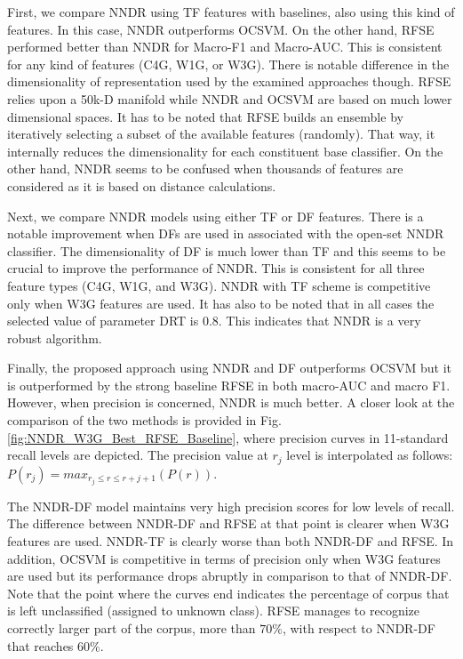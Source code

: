 First, we compare NNDR using TF features with baselines, also using this kind of features. In this case, NNDR outperforms OCSVM. On the other hand, RFSE performed better than NNDR for Macro-F1 and Macro-AUC. This is consistent for any kind of features (C4G, W1G, or W3G). There is notable difference in the dimensionality of representation used by the examined approaches though. RFSE relies upon a 50k-D manifold while NNDR and OCSVM are based on much lower dimensional spaces. It has to be noted that RFSE builds an ensemble by iteratively selecting a subset of the available features (randomly). That way, it internally reduces the dimensionality for each constituent base classifier. On the other hand, NNDR seems to be confused when thousands of features are considered as it is based on distance calculations. 

Next, we compare NNDR models using either TF or DF features. There is a notable improvement when DFs are used in associated with the open-set NNDR classifier. The dimensionality of DF is much lower than TF and this seems to be crucial to improve the performance of NNDR. This is consistent for all three feature types (C4G, W1G, and W3G). NNDR with TF scheme is competitive only when W3G features are used. It has also to be noted that in all cases the selected value of parameter DRT is 0.8. This indicates that NNDR is a very robust algorithm.

Finally, the proposed approach using NNDR and DF outperforms OCSVM but it is outperformed by the strong baseline RFSE in both macro-AUC and macro F1. However, when precision is concerned, NNDR is much better. A closer look at  the comparison of the two methods is provided in Fig. \ref{fig:NNDR_W3G_Best_RFSE_Baseline}, where precision curves in 11-standard recall levels are depicted. The precision value at $r_j$ level is interpolated as follows: $P(r_j)=max_{r_j \leq r \leq r+{j+1}}(P(r))$.

The NNDR-DF model maintains very high precision scores for low levels of recall. The difference between NNDR-DF and RFSE at that point is clearer when W3G features are used. NNDR-TF is clearly worse than both NNDR-DF and RFSE. In addition, OCSVM is competitive in terms of precision only when W3G features are used but its performance drops abruptly in comparison to that of NNDR-DF. Note that the point where the curves end indicates the percentage of corpus that is left unclassified (assigned to unknown class). RFSE manages to recognize correctly larger part of the corpus, more than $70\%$, with respect to NNDR-DF that reaches $60\%$. 

